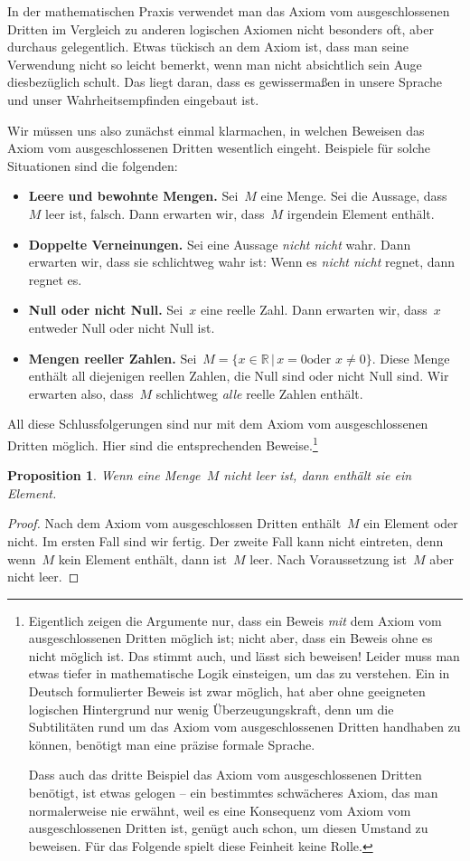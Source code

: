 \documentclass[twoside]{../zirkelblatt}
\newcommand{\RR}{\mathbb{R}}
\theoremstyle{definition}
\theoremstyle{plain}
\newtheorem{prop}[defn]{Proposition}
\theoremstyle{remark}
\begin{document}
In der mathematischen Praxis verwendet man das Axiom vom ausgeschlossenen
Dritten im Vergleich zu anderen logischen Axiomen nicht besonders oft, aber
durchaus gelegentlich. Etwas tückisch an dem Axiom ist, dass man seine
Verwendung nicht so leicht bemerkt, wenn man nicht absichtlich sein Auge
diesbezüglich schult. Das liegt daran, dass es gewissermaßen in unsere Sprache
und unser Wahrheitsempfinden eingebaut ist.

Wir müssen uns also zunächst einmal klarmachen, in welchen Beweisen das Axiom vom
ausgeschlossenen Dritten wesentlich eingeht. Beispiele für solche
Situationen sind die folgenden:

\begin{itemize}
\item \textbf{Leere und bewohnte Mengen.} Sei~$M$ eine Menge. Sei die Aussage,
dass~$M$ leer ist, falsch. Dann erwarten wir, dass~$M$ irgendein Element
enthält.
\item \textbf{Doppelte Verneinungen.} Sei eine Aussage \emph{nicht nicht} wahr.
Dann erwarten wir, dass sie schlichtweg wahr ist: Wenn es \emph{nicht nicht}
regnet, dann regnet es.
\item \textbf{Null oder nicht Null.} Sei~$x$ eine reelle Zahl. Dann erwarten wir,
dass~$x$ entweder Null oder nicht Null ist.
\item \textbf{Mengen reeller Zahlen.} Sei~$M = \{ x \in \RR \,|\, \text{$x = 0$
oder $x \neq 0$} \}$. Diese Menge enthält all diejenigen reellen Zahlen, die Null sind
oder nicht Null sind. Wir erwarten also, dass~$M$ schlichtweg \emph{alle}
reelle Zahlen enthält.
\end{itemize}

All diese Schlussfolgerungen sind nur mit dem Axiom vom ausgeschlossenen
Dritten möglich. Hier sind die entsprechenden Beweise.\footnote{Eigentlich
zeigen die Argumente nur, dass ein Beweis \emph{mit} dem
Axiom vom ausgeschlossenen Dritten möglich ist; nicht aber, dass ein Beweis
ohne es nicht möglich ist. Das stimmt auch, und lässt sich beweisen!
Leider muss man etwas tiefer in mathematische Logik einsteigen, um das zu
verstehen. Ein in Deutsch formulierter Beweis ist zwar möglich, hat aber ohne
geeigneten logischen Hintergrund nur wenig Überzeugungskraft, denn um die
Subtilitäten rund um das Axiom vom ausgeschlossenen Dritten handhaben zu
können, benötigt man eine präzise formale Sprache.

\noindent Dass auch das dritte Beispiel das Axiom vom ausgeschlossenen Dritten benötigt,
ist etwas gelogen -- ein bestimmtes schwächeres Axiom, das man normalerweise nie
erwähnt, weil es eine Konsequenz vom Axiom vom ausgeschlossenen Dritten ist,
genügt auch schon, um diesen Umstand zu beweisen. Für das Folgende spielt diese
Feinheit keine Rolle.}
\begin{prop}Wenn eine Menge~$M$ nicht leer ist, dann enthält sie ein Element.
\end{prop}
\begin{proof}
Nach dem Axiom vom ausgeschlossen Dritten enthält~$M$ ein Element oder nicht.
Im ersten Fall sind wir fertig. Der zweite Fall kann nicht eintreten, denn
wenn~$M$ kein Element enthält, dann ist~$M$ leer. Nach Voraussetzung
ist~$M$ aber nicht leer.
\end{proof}
\end{document}
